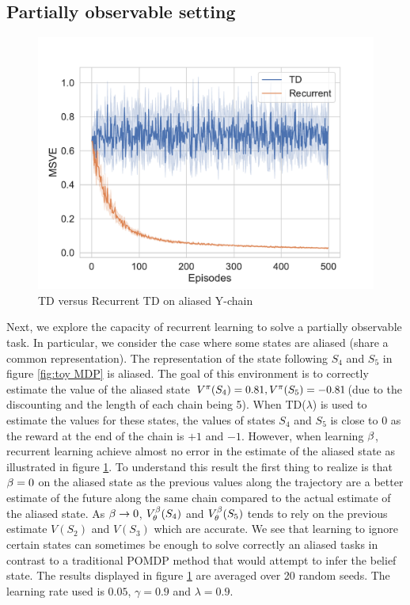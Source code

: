 \subsection{Partially observable setting}
\begin{figure}[h]
    \centering
    \includegraphics[scale=0.6]{fig/POMDP.pdf}
    \caption{TD versus Recurrent TD on aliased Y-chain}
    \label{fig:pomdp}
\end{figure}
Next, we explore the capacity of recurrent learning to solve a partially observable task. In particular, we consider the case where some states are aliased (share a common representation). The representation of the state following $S_4$ and $S_5$ in figure \ref{fig:toy MDP} is aliased. The goal of this environment is to correctly estimate the value of the aliased state $V^{\pi}(S_4)=0.81,V^{\pi}(S_5)=-0.81$(due to the discounting and the length of each chain being 5). When TD($\lambda$) is used to estimate the values for these states, the values of states $S_4$ and $S_5$ is close to 0 as the reward at the end of the chain is $+1$ and $-1$. However, when learning $\beta$, recurrent learning achieve almost no error in the estimate of the aliased state as illustrated in figure \ref{fig:pomdp}. To understand this result the first thing to realize is that $\beta=0$ on the aliased state as the previous values along the trajectory are a better estimate of the future along the same chain compared to the actual estimate of the aliased state. As $\beta \to 0$, $V^{\beta}_{\theta}(S_4)$ and $V^{\beta}_{\theta}(S_5)$ tends to rely on the previous estimate $V(S_2)$ and $V(S_3)$ which are accurate. We see that learning to ignore certain states can sometimes be enough to solve correctly an aliased tasks in contrast to a traditional POMDP method that would attempt to infer the belief state. The results displayed in figure \ref{fig:pomdp} are averaged over 20 random seeds. The learning rate used is $0.05$, $\gamma = 0.9$ and $\lambda = 0.9$.
